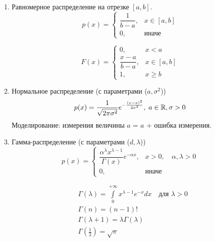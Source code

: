 \begin{example}~

	\begin{enumerate}
		\item 
			Равномерное распределение на отрезке $[a, b]$.
			\begin{equation*}
				p(x) =
				\begin{cases}
					\dfrac{1}{b - a},&x \in [a, b]\\
					0				,&\text{иначе}
				\end{cases}		
			\end{equation*}
			
			\begin{equation*}
				F(x) =
				\begin{cases}
					0, &x < a\\
					\dfrac{x - a}{b - a}, &x \in [a, b]\\
					1, &x \geq b
				\end{cases}
			\end{equation*}
		
		\item 
			Нормальное распределение (с параметрами ($a, \sigma^2$))
			\begin{equation*}
				p(x) = \frac{1}{\sqrt{2\pi \sigma^2}} e^{-\frac{(x - a)^2}{2 \sigma^2}},\;
				a \in \mathbb{R}, \sigma > 0
			\end{equation*}
			Моделирование: измерения величины $a$ = $a$ + ошибка измерения.
		
		\item 
			Гамма-распределение (с параметрами ($d, \lambda$))
			\begin{equation*}			
				p(x) = 			
				\begin{cases}
					\dfrac{\alpha^\lambda x^{\lambda - 1}}{\Gamma(x)} e^{-\alpha x}, 
					&x > 0, \quad \alpha, \lambda > 0\\
					0, &\text{иначе}
				\end{cases}
			\end{equation*}
			\begin{definition}
				\begin{align*}				
					&\Gamma(\lambda) = \int\limits_{0}^{+\infty} x^{\lambda - 1} e^{-x} dx 
						\quad \text{для $\lambda > 0$} \\
					&\Gamma(n) = (n - 1)!\\
					&\Gamma(\lambda + 1) = \lambda \Gamma(\lambda)\\
					&\Gamma \left( \frac{1}{2} \right) = \sqrt{\pi}
				\end{align*}
			\end{definition}
			

\end{enumerate}
\end{example}
